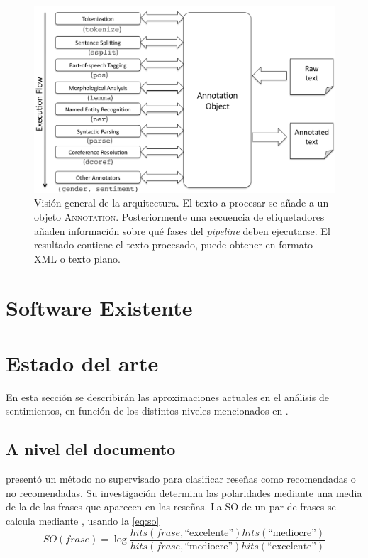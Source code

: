 \begin{figure}[bth]
  \includegraphics[width=1\linewidth]{gfx/corenlppipe.png}
  \caption[Visualización del \emph{pipeline} de \textsc{CoreNLP}]{Visión general
    de la arquitectura. El texto a procesar se añade a un objeto
    \textsc{Annotation}. Posteriormente una secuencia de etiquetadores añaden
    información sobre qué fases del \emph{pipeline} deben ejecutarse. El
    resultado contiene el texto procesado, puede obtener en formato \ac{XML} o
    texto plano.}
  \label{fig:corenlppipe}
\end{figure}

\section{Software Existente}
\label{sec:nlpsoftware}


\section{Estado del arte}
\label{sec:stateoftheart}

En esta sección se describirán las aproximaciones actuales en el análisis de
sentimientos, en función de los distintos niveles mencionados en
.

\subsection{A nivel del documento}
\label{subsec:soadocument}

\citeauthor{Turney2002} \cite{Turney2002} presentó un método no supervisado para
clasificar reseñas como recomendadas o no recomendadas. Su investigación
determina las polaridades mediante una media de la
 de las frases
que aparecen en las reseñas. La \ac{SO} de un par de frases se calcula mediante
 \cite{Turney2001}, usando la \autoref{eq:so}
\begin{equation}
  \label{eq:so}
  SO(frase) = \log\frac{hits(frase,
    \text{``excelente''})hits(\text{``mediocre''})}{hits(frase, \text{``mediocre''})hits(\text{``excelente''})}
\end{equation}

